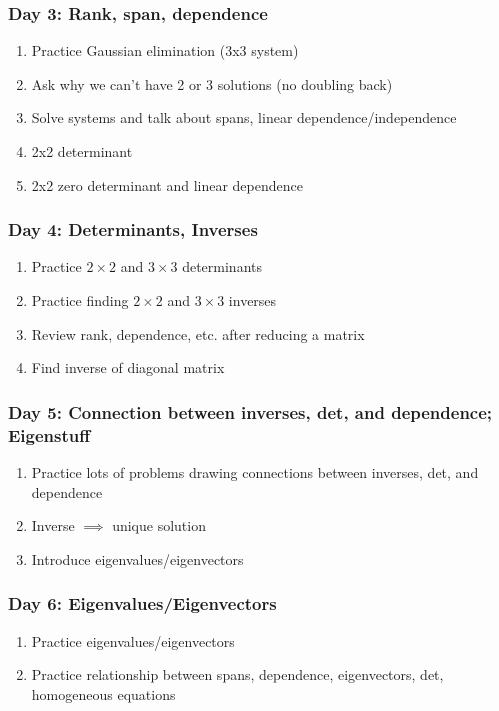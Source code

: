 \subsubsection*{Day 3: Rank, span, dependence}
\label{sec:day-3:-rank}

\begin{enumerate}
\item Practice Gaussian elimination (3x3 system)
\item Ask why we can't have 2 or 3 solutions (no doubling back)
\item Solve systems and talk about spans, linear dependence/independence
\item 2x2 determinant
\item 2x2 zero determinant and linear dependence
\end{enumerate}

\subsubsection*{Day 4: Determinants, Inverses}
\label{sec:day-4:-determinants}

\begin{enumerate}
\item Practice $2\times 2$ and $3\times 3$ determinants
\item Practice finding $2\times 2$ and $3\times 3$ inverses
\item Review rank, dependence, etc. after reducing a matrix
\item Find inverse of diagonal matrix
\end{enumerate}


\subsubsection*{Day 5: Connection between inverses, det, and dependence; Eigenstuff}

\begin{enumerate}
\item Practice lots of problems drawing connections between inverses, det, and dependence
\item Inverse $\implies$ unique solution
\item Introduce eigenvalues/eigenvectors
\end{enumerate}

\subsubsection*{Day 6: Eigenvalues/Eigenvectors}
\label{sec:eigenv}

\begin{enumerate}
\item Practice eigenvalues/eigenvectors
\item Practice relationship between spans, dependence, eigenvectors, det, homogeneous equations
\end{enumerate}

 


